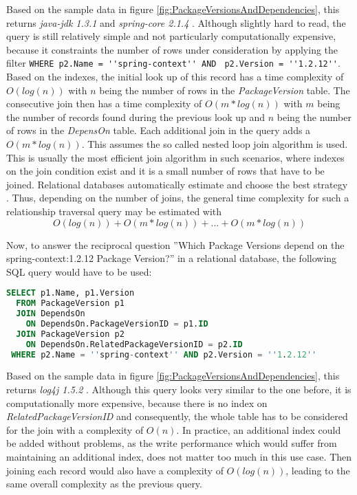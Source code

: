 Based on the sample data in figure \ref{fig:PackageVersionsAndDependencies}, this returns \emph{java-jdk 1.3.1} and \emph{spring-core 2.1.4} \cite{neo4j}. Although slightly hard to read, the query is still relatively simple and not particularly computationally expensive, because it constraints the number of rows under consideration by applying the filter \lstinline|WHERE p2.Name = ''spring-context'' AND | \lstinline|p2.Version = ''1.2.12''|. Based on the indexes, the initial look up of this record has a time complexity of $O(log(n))$ with $n$ being the number of rows in the \emph{PackageVersion} table. The consecutive join then has a time complexity of $O(m*log(n))$ with $m$ being the number of records found during the previous look up and $n$ being the number of rows in the \emph{DepensOn} table. Each additional join in the query adds a $O(m*log(n))$. This assumes the so called nested loop join algorithm is used. This is usually the most efficient join algorithm in such scenarios, where indexes on the join condition exist and it is a small number of rows that have to be joined. Relational databases automatically estimate and choose the best strategy \cite{PostgreSQLJoin}. Thus, depending on the number of joins, the general time complexity for such a relationship traversal query may be estimated with
$$O(log(n)) + O(m*log(n)) + ... + O(m*log(n))$$ 

Now, to answer the reciprocal question ''Which Package Versions depend on the spring-context:1.2.12 Package Version?'' in a relational database, the following SQL query would have to be used:

\begin{lstlisting}[language=SQL, caption=Package Version Reciprocal Dependencies, captionpos=b, label=lst:PackageVersionReciprocalDependencies]
SELECT p1.Name, p1.Version
  FROM PackageVersion p1 
  JOIN DependsOn
    ON DependsOn.PackageVersionID = p1.ID
  JOIN PackageVersion p2
    ON DependsOn.RelatedPackageVersionID = p2.ID
 WHERE p2.Name = ''spring-context'' AND p2.Version = ''1.2.12''
\end{lstlisting}

Based on the sample data in figure \ref{fig:PackageVersionsAndDependencies}, this returns \emph{log4j 1.5.2} \cite{neo4j}. Although this query looks very similar to the one before, it is computationally more expensive, because there is no index on \emph{RelatedPackageVersionID} and consequently, the whole table has to be considered for the join with a complexity of $O(n)$. In practice, an additional index could be added without problems, as the write performance which would suffer from maintaining an additional index, does not matter too much in this use case. Then joining each record would also have a complexity of $O(log(n))$, leading to the same overall complexity as the previous query.\\

